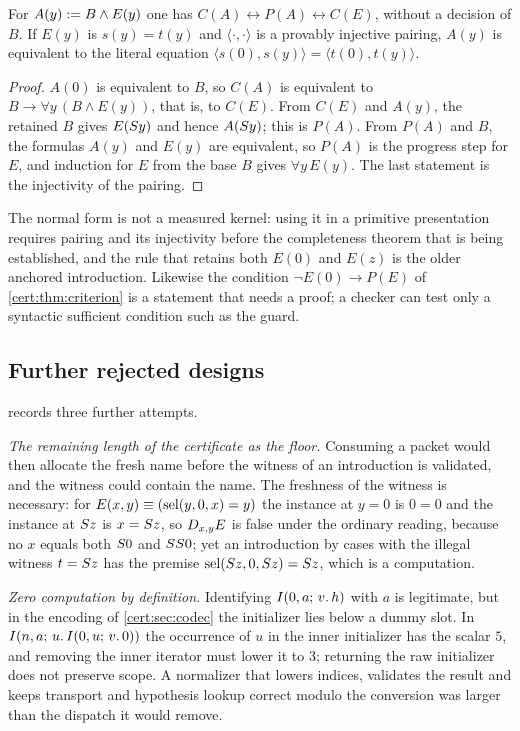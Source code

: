 \begin{proposition}\label{cert:prop:base-normal}
For $A(y)\mathrel{:=} B\land E(y)$ one has
$C(A)\leftrightarrow P(A)\leftrightarrow C(E)$, without a decision of $B$. If
$E(y)$ is $s(y)=t(y)$ and $\langle\cdot,\cdot\rangle$ is a provably injective
pairing, $A(y)$ is equivalent to the literal equation
$\langle s(0),s(y)\rangle=\langle t(0),t(y)\rangle$.
\end{proposition}
\begin{proof}
$A(0)$ is equivalent to $B$, so $C(A)$ is equivalent to
$B\to\forall y\,(B\land E(y))$, that is, to $C(E)$. From $C(E)$ and $A(y)$,
the retained $B$ gives $E(S y)$ and hence $A(S y)$; this is $P(A)$.
From $P(A)$ and $B$, the formulas $A(y)$ and $E(y)$ are equivalent, so $P(A)$
is the progress step for $E$, and induction for $E$ from the base $B$ gives
$\forall y\,E(y)$. The last statement is the injectivity of the pairing.
\end{proof}

The normal form is not a measured kernel: using it in a primitive
presentation requires pairing and its injectivity before the completeness
theorem that is being established, and the rule that retains both $E(0)$ and
$E(z)$ is the older anchored introduction. Likewise the condition
$\neg E(0)\to P(E)$ of \cref{cert:thm:criterion} is a statement that needs a
proof; a checker can test only a syntactic sufficient condition such as the
guard.

\subsection{Further rejected designs}

 records three further attempts.

\emph{The remaining length of the certificate as the floor.} Consuming a
packet would then allocate the fresh name before the witness of an
introduction is validated, and the witness could contain the name. The
freshness of the witness is necessary: for
$E(x,y)\equiv(\operatorname{sel}(y,0,x)=y)$ the instance at $y=0$ is $0=0$ and the instance
at $S z$ is $x=S z$, so $D_{x,y}E$ is false under the ordinary reading,
because no $x$ equals both $S 0$ and $SS 0$; yet an introduction by
cases with the illegal witness $t=S z$ has the premise
$\operatorname{sel}(S z,0,S z)=S z$, which is a computation.

\emph{Zero computation by definition.} Identifying $I(0,a;\,v.\,h)$ with $a$
is legitimate, but in the encoding of \cref{cert:sec:codec} the initializer
lies below a dummy slot. In $I(n,a;\,u.\,I(0,u;\,v.\,0))$ the occurrence of
$u$ in the inner initializer has the scalar $5$, and removing the inner
iterator must lower it to $3$; returning the raw initializer does not preserve
scope. A normalizer that lowers indices, validates the result and keeps
transport and hypothesis lookup correct modulo the conversion was larger than
the dispatch it would remove.

